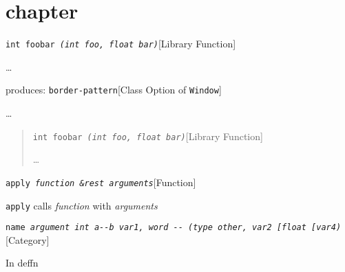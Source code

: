 \documentclass{book}
\begin{document}
\label{anchor:Top}%
\chapter{chapter}
\label{anchor:chapter}%

\noindent\texttt{int foobar \bgroup{}\normalfont{}\textsl{(int \textsl{foo}, float \textsl{bar})}\egroup{}}\hfill[Library Function]



%
\dots{}\@

\noindent{}produces:
\noindent\texttt{border-pattern}\hfill[Class Option of \texttt{Window}]



%
\dots{}\@

\begin{quote}
\noindent\texttt{int foobar \bgroup{}\normalfont{}\textsl{(int \textsl{foo}, float \textsl{bar})}\egroup{}}\hfill[Library Function]



%
\dots{}\@
\end{quote}

\noindent\texttt{apply \bgroup{}\normalfont{}\textsl{function \&rest arguments}\egroup{}}\hfill[Function]



%
\texttt{apply} calls \textsl{function} with \textsl{arguments}

\noindent\texttt{name \bgroup{}\normalfont{}\textsl{argument \texttt{int} \texttt{a{-}{-}b} \textsl{var1}, word \texttt{{-}{-}} (\texttt{type other}, \textsl{var2}  {[}\texttt{float} {[}\textsl{var4})}\egroup{}}\hfill[Category]



%
In deffn
\end{document}
